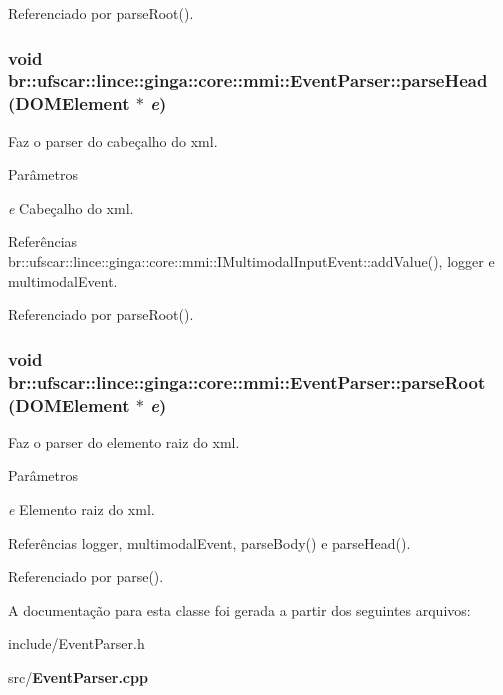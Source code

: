 Referenciado por parseRoot().

\subsubsection[{parseHead}]{\setlength{\rightskip}{0pt plus 5cm}void br::ufscar::lince::ginga::core::mmi::EventParser::parseHead (DOMElement $\ast$ {\em e})\hspace{0.3cm}{\ttfamily  [virtual]}}\label{classbr_1_1ufscar_1_1lince_1_1ginga_1_1core_1_1mmi_1_1EventParser_a1aa98a55ccd74a3fe2458c253cd6dafe}
Faz o parser do cabeçalho do xml. 
\begin{DoxyParams}{Parâmetros}
\item[{\em e}]Cabeçalho do xml. \end{DoxyParams}


Referências br::ufscar::lince::ginga::core::mmi::IMultimodalInputEvent::addValue(), logger e multimodalEvent.



Referenciado por parseRoot().

\subsubsection[{parseRoot}]{\setlength{\rightskip}{0pt plus 5cm}void br::ufscar::lince::ginga::core::mmi::EventParser::parseRoot (DOMElement $\ast$ {\em e})\hspace{0.3cm}{\ttfamily  [virtual]}}\label{classbr_1_1ufscar_1_1lince_1_1ginga_1_1core_1_1mmi_1_1EventParser_a351b2c596f5e216b149176a4beac04f1}
Faz o parser do elemento raiz do xml. 
\begin{DoxyParams}{Parâmetros}
\item[{\em e}]Elemento raiz do xml. \end{DoxyParams}


Referências logger, multimodalEvent, parseBody() e parseHead().



Referenciado por parse().



A documentação para esta classe foi gerada a partir dos seguintes arquivos:\begin{DoxyCompactItemize}
\item 
include/EventParser.h\item 
src/{\bf EventParser.cpp}\end{DoxyCompactItemize}
